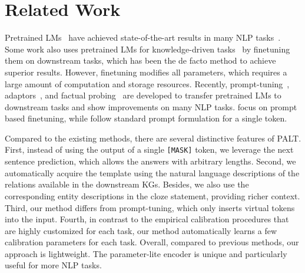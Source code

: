 \documentclass[11pt]{article}
\newcommand{\method}{\textsc{PALT}}
\newcommand{\textspt}[1]{\texttt{#1}}
\begin{document}
 \section{Related Work}
Pretrained LMs~\cite{BERT, liu_roberta:_2019, radford2019language,brown_language_2020, lewis_bart:_2020, raffel_exploring_2020,wang-etal-2022-deepstruct} have achieved state-of-the-art results in many NLP tasks~\cite{wang_glue:_2018, wang_superglue:_2019}. Some work also uses pretrained LMs for knowledge-driven tasks~\cite{KGBERT,LM4KG,inspecting} by finetuning them on downstream tasks, which has been the de facto method to achieve superior results. However, finetuning modifies all parameters, which requires a large amount of computation and storage resources. Recently, prompt-tuning~\cite{shin-etal-2020-autoprompt, liu_gpt_2021}, adaptors~\cite{pmlr-v97-houlsby19a, k-adapter, newman_p-adapters:_2021}, and factual probing~\cite{he2021empirical, LAMA, wang2020language, wang2021zero} are developed to transfer pretrained LMs to downstream tasks and show improvements on many NLP tasks. \citet{few_learn} focus on prompt based finetuning, while \citet{lm_know} follow standard prompt formulation for a single token. 

Compared to the existing methods, there are several distinctive features of \method. First, instead of using the output of a single \textspt{[MASK]} token, we leverage the next sentence prediction, which allows the answers with arbitrary lengths. Second, we automatically acquire the template using the natural language descriptions of the relations available in the downstream KGs. Besides, we also use the corresponding entity descriptions in the cloze statement, providing richer context. Third, our method differs from prompt-tuning, which only inserts virtual tokens into the input. Fourth, in contrast to the empirical calibration procedures that are highly customized for each task, our method automatically learns a few calibration parameters for each task. Overall, compared to previous methods, our approach is lightweight. The parameter-lite encoder is unique and particularly useful for more NLP tasks.
\end{document}
